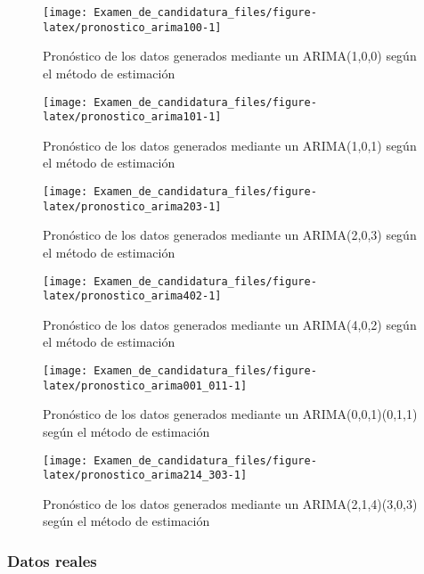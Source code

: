 \documentclass[
]{article}
\begin{document}
\begin{figure}[H]
\texttt{[image: Examen\_de\_candidatura\_files/figure-latex/pronostico\_arima100-1]} \caption{Pronóstico de los datos generados mediante un ARIMA(1,0,0) según el método de estimación}\label{fig:pronostico_arima100}
\end{figure}

\begin{figure}[H]
\texttt{[image: Examen\_de\_candidatura\_files/figure-latex/pronostico\_arima101-1]} \caption{Pronóstico de los datos generados mediante un ARIMA(1,0,1) según el método de estimación}\label{fig:pronostico_arima101}
\end{figure}

\begin{figure}[H]
\texttt{[image: Examen\_de\_candidatura\_files/figure-latex/pronostico\_arima203-1]} \caption{Pronóstico de los datos generados mediante un ARIMA(2,0,3) según el método de estimación}\label{fig:pronostico_arima203}
\end{figure}

\begin{figure}[H]
\texttt{[image: Examen\_de\_candidatura\_files/figure-latex/pronostico\_arima402-1]} \caption{Pronóstico de los datos generados mediante un ARIMA(4,0,2) según el método de estimación}\label{fig:pronostico_arima402}
\end{figure}

\begin{figure}[H]
\texttt{[image: Examen\_de\_candidatura\_files/figure-latex/pronostico\_arima001\_011-1]} \caption{Pronóstico de los datos generados mediante un ARIMA(0,0,1)(0,1,1) según el método de estimación}\label{fig:pronostico_arima001_011}
\end{figure}

\begin{figure}[H]
\texttt{[image: Examen\_de\_candidatura\_files/figure-latex/pronostico\_arima214\_303-1]} \caption{Pronóstico de los datos generados mediante un ARIMA(2,1,4)(3,0,3) según el método de estimación}\label{fig:pronostico_arima214_303}
\end{figure}

\subsubsection{Datos reales}
\end{document}
